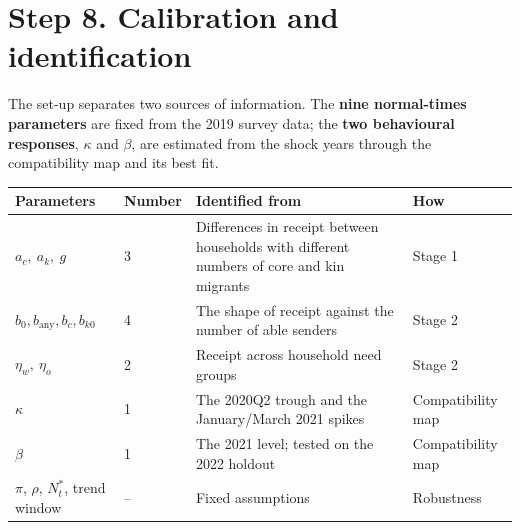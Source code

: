\documentclass[11pt]{article}
\begin{document}
\section*{Step 8. Calibration and identification}

The set-up separates two sources of information. The \textbf{nine normal-times parameters} are fixed from the 2019 survey data; the \textbf{two behavioural responses}, $\kappa$ and $\beta$, are estimated from the shock years through the compatibility map and its best fit.

\begin{center}
\begin{tabularx}{\linewidth}{llXl}
\toprule
Parameters & Number & Identified from & How \\
\midrule
$a_c,\ a_k,\ g$ & 3 & Differences in receipt between households with different numbers of core and kin migrants & Stage 1 \\
$b_0, b_{\text{any}}, b_c, b_{k0}$ & 4 & The shape of receipt against the number of able senders & Stage 2 \\
$\eta_w,\ \eta_o$ & 2 & Receipt across household need groups & Stage 2 \\
$\kappa$ & 1 & The 2020Q2 trough and the January/March 2021 spikes & Compatibility map \\
$\beta$ & 1 & The 2021 level; tested on the 2022 holdout & Compatibility map \\
$\pi$, $\rho$, $N^*_t$, trend window & -- & Fixed assumptions & Robustness \\
\bottomrule
\end{tabularx}
\end{center}
\end{document}
